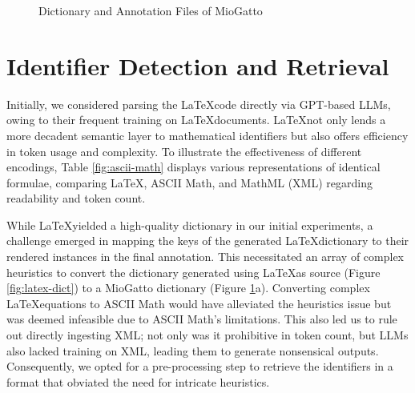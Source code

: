 \begin{figure}[htpb]
  \centering
  \quad 
  \caption[LaTeXML Preprocessing]{Dictionary and Annotation Files of MioGatto}\label{fig:miogatto-data}
\end{figure}

\section{Identifier Detection and Retrieval}\label{sec:pre-processing}

Initially, we considered parsing the \LaTeX \space code directly via GPT-based LLMs, owing to their frequent training on \LaTeX \space documents. \LaTeX \space not only lends a more decadent semantic layer to mathematical identifiers but also offers efficiency in token usage and complexity. To illustrate the effectiveness of different encodings, Table \ref{fig:ascii-math} displays various representations of identical formulae, comparing \LaTeX, ASCII Math, and MathML (XML) regarding readability and token count.

While \LaTeX \space yielded a high-quality dictionary in our initial experiments, a challenge emerged in mapping the keys of the generated \LaTeX \space dictionary to their rendered instances in the final annotation. This necessitated an array of complex heuristics to convert the dictionary generated using \LaTeX \space as source (Figure \ref{fig:latex-dict}) to a MioGatto dictionary (Figure \ref{fig:miogatto-data}a). Converting complex \LaTeX \space equations to ASCII Math would have alleviated the heuristics issue but was deemed infeasible due to ASCII Math's limitations. This also led us to rule out directly ingesting XML; not only was it prohibitive in token count, but LLMs also lacked training on XML, leading them to generate nonsensical outputs. Consequently, we opted for a pre-processing step to retrieve the identifiers in a format that obviated the need for intricate heuristics.

